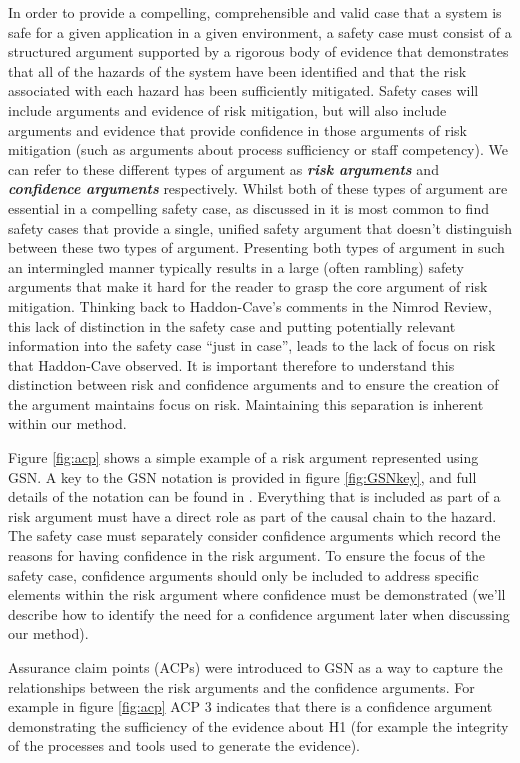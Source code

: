 In order to provide a compelling, comprehensible and valid case that a system is safe for a given application in a given environment, a safety case must consist of a structured argument supported by a rigorous body of evidence that demonstrates that all of the hazards of the system have been identified and that the risk associated with each hazard has been sufficiently mitigated. Safety cases will include arguments and evidence of risk mitigation, but will also include arguments and evidence that provide confidence in those arguments of risk mitigation (such as arguments about process sufficiency or staff competency). We can refer to these different types of argument as \textbf{\textit{risk arguments}} and \textbf{\textit{confidence arguments}} respectively. Whilst both of these types of argument are essential in a compelling safety case, as discussed in \cite{hawkins2011new} it is most common to find safety cases that provide a single, unified safety argument that doesn't distinguish between these two types of argument. Presenting both types of argument in such an intermingled manner typically results in a large (often rambling) safety arguments that make it hard for the reader to grasp the core argument of risk mitigation. Thinking back to Haddon-Cave's comments in the Nimrod Review, this lack of distinction in the safety case and putting potentially relevant information into the safety case ``just in case'', leads to the lack of focus on risk that Haddon-Cave observed. It is important therefore to understand this distinction between risk and confidence arguments and to ensure the creation of the argument maintains focus on risk. Maintaining this separation is inherent within our method.

 Figure \ref{fig:acp} shows a simple example of a risk argument represented using GSN. A key to the GSN notation is provided in figure \ref{fig:GSNkey}, and full details of the notation can be found in \cite{group2021a}. Everything that is included as part of a risk argument must have a direct role as part of the causal chain to the hazard. The safety case must separately consider confidence arguments which record the reasons for having confidence in the risk argument. To ensure the focus of the safety case, confidence arguments should only be included to address specific elements within the risk argument where confidence must be demonstrated (we'll describe how to identify the need for a confidence argument later when discussing our method).
 
 Assurance claim points (ACPs) were introduced to GSN as a way to capture the relationships between the risk arguments and the confidence arguments. For example in figure \ref{fig:acp} ACP 3 indicates that there is a confidence argument demonstrating the sufficiency of the evidence about H1 (for example the integrity of the processes and tools used to generate the evidence).



